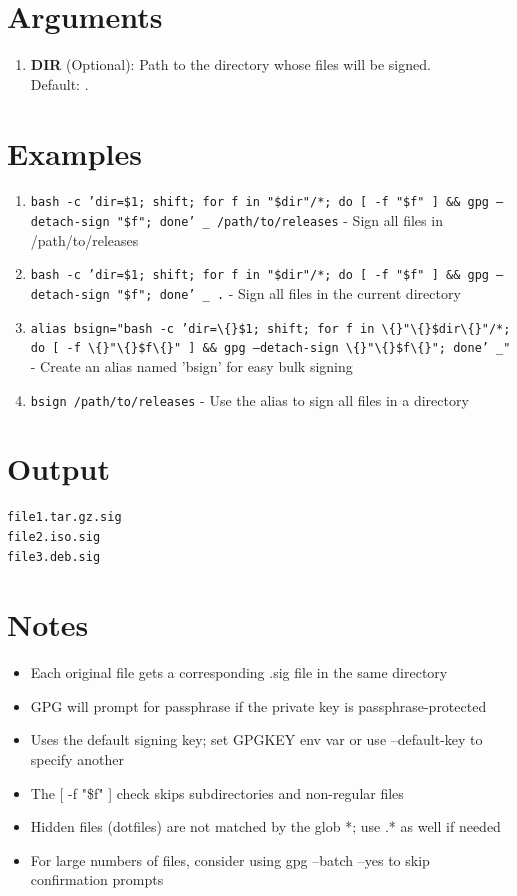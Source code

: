 \documentclass{article}
\begin{document}
\section*{Arguments}
\begin{enumerate}
  \item \textbf{DIR} (Optional): Path to the directory whose files will be signed. \\ Default: .
\end{enumerate}

\section*{Examples}
\begin{enumerate}
  \item \texttt{bash -c 'dir=\$1; shift; for f in "\$dir"/*; do [ -f "\$f" ] \&\& gpg --detach-sign "\$f"; done' \_ /path/to/releases} - Sign all files in /path/to/releases
  \item \texttt{bash -c 'dir=\$1; shift; for f in "\$dir"/*; do [ -f "\$f" ] \&\& gpg --detach-sign "\$f"; done' \_ .} - Sign all files in the current directory
  \item \texttt{alias bsign="bash -c 'dir=\textbackslash\{\}\$1; shift; for f in \textbackslash\{\}"\textbackslash\{\}\$dir\textbackslash\{\}"/*; do [ -f \textbackslash\{\}"\textbackslash\{\}\$f\textbackslash\{\}" ] \&\& gpg --detach-sign \textbackslash\{\}"\textbackslash\{\}\$f\textbackslash\{\}"; done' \_"} - Create an alias named 'bsign' for easy bulk signing
  \item \texttt{bsign /path/to/releases} - Use the alias to sign all files in a directory
\end{enumerate}

\section*{Output}
\begin{lstlisting}
file1.tar.gz.sig
file2.iso.sig
file3.deb.sig
\end{lstlisting}

\section*{Notes}
\begin{itemize}
  \item Each original file gets a corresponding .sig file in the same directory
  \item GPG will prompt for passphrase if the private key is passphrase-protected
  \item Uses the default signing key; set GPGKEY env var or use --default-key to specify another
  \item The [ -f "\$f" ] check skips subdirectories and non-regular files
  \item Hidden files (dotfiles) are not matched by the glob *; use .* as well if needed
  \item For large numbers of files, consider using gpg --batch --yes to skip confirmation prompts
\end{itemize}
\end{document}

